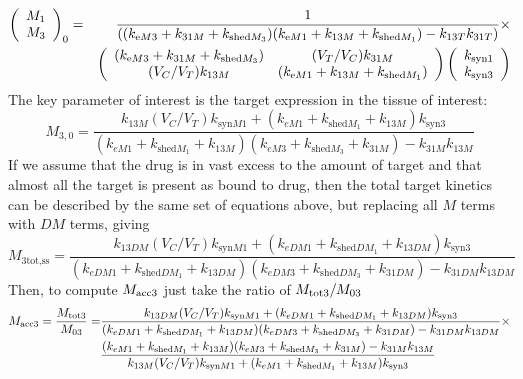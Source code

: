 \begin{eqnarray*}
\left(\begin{array}{c}
M_{1}\\
M_{3}
\end{array}\right)_{0} & = & \frac{1}{\left( (k_{\text{e} M3}+k_{31M}+k_{\text{shed}M_3})(k_{\text{e} M1}+k_{13M}+k_{\text{shed}M_1}) -k_{13T}k_{31T}\right)}\times\\ & & \left(\begin{array}{cc}
(k_{\text{e} M3}+k_{31M}+k_{\text{shed}M_3}) & (V_{T}/V_{C})k_{31M}\\
(V_{C}/V_{T})k_{13M}  &(k_{\text{e} M1}+k_{13M}+k_{\text{shed}M_1}) 
\end{array}\right)\left(\begin{array}{c}
k_{\text{syn}1}\\
k_{\text{syn}3}
\end{array}\right)
\end{eqnarray*}
The key parameter of interest is the target expression in the tissue
of interest: 
\[
M_{3,0}=\frac{k_{13M}(V_C/V_T)k_{\text{syn}M1}+(k_{eM1}+k_{\text{shed}M_1}+k_{13M})k_{\text{syn}3}}{(k_{eM1}+k_{\text{shed}M_1}+k_{13M})(k_{eM3}+k_{\text{shed}M_3}+k_{31M})-k_{31M}k_{13M}}
\]
If we assume that the drug is in vast excess to the amount of target
and that almost all the target is present as bound to drug, then the
total target kinetics can be described by the same set of equations
above, but replacing all $M$ terms with $DM$ terms, giving
\[
M_{3\text{tot,ss}}=\frac{k_{13DM}(V_C/V_T)k_{\text{syn}M1}+(k_{eDM1}+k_{\text{shed}DM_1}+k_{13DM})k_{\text{syn}3}}{(k_{eDM1}+k_{\text{shed}DM_1}+k_{13DM})(k_{eDM3}+k_{\text{shed}DM_3}+k_{31DM})-k_{31DM}k_{13DM}}
\]
Then, to compute $M_{\text{acc}3}$ just take the ratio of $M_{\text{tot}3}/M_{03}$
\begin{align*}
M_{\text{acc}3}=\frac{M_{\text{tot}3}}{M_{03}}=&\frac{k_{13DM}(V_C/V_T)k_{\text{syn}M1}+(k_{eDM1}+k_{\text{shed}DM_1}+k_{13DM})k_{\text{syn}3}}{(k_{eDM1}+k_{\text{shed}DM_1}+k_{13DM})(k_{eDM3}+k_{\text{shed}DM_3}+k_{31DM})-k_{31DM}k_{13DM}}\times\\
&\frac{(k_{eM1}+k_{\text{shed}M_1}+k_{13M})(k_{eM3}+k_{\text{shed}M_3}+k_{31M})-k_{31M}k_{13M}}{k_{13M}(V_C/V_T)k_{\text{syn}M1}+(k_{eM1}+k_{\text{shed}M_1}+k_{13M})k_{\text{syn}3}}
\end{align*}
